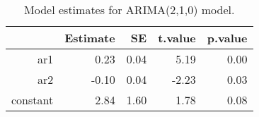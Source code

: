 \begin{table}[ht]
\centering
\begin{tabular}{rrrrr}
  \hline
 & Estimate & SE & t.value & p.value \\ 
  \hline
ar1 & 0.23 & 0.04 & 5.19 & 0.00 \\ 
  ar2 & -0.10 & 0.04 & -2.23 & 0.03 \\ 
  constant & 2.84 & 1.60 & 1.78 & 0.08 \\ 
   \hline
\end{tabular}
\caption{Model estimates for ARIMA(2,1,0) model.}
\end{table}